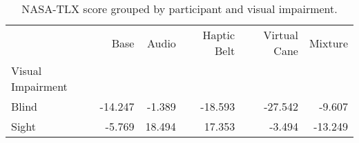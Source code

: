
\begin{table}[!htb]
\centering
\caption{NASA-TLX score grouped by participant and visual impairment.}
\label{tab:nasa_average_group}
\begin{tabular}{lrrrrr}
\toprule
{} &    Base &  Audio &  Haptic Belt &  Virtual Cane &  Mixture \\
Visual Impairment &         &        &              &               &          \\
\midrule
Blind             & -14.247 & -1.389 &      -18.593 &       -27.542 &   -9.607 \\
Sight             &  -5.769 & 18.494 &       17.353 &        -3.494 &  -13.249 \\
\bottomrule
\end{tabular}
\end{table}

